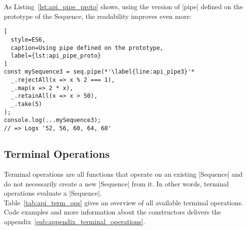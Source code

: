 As Listing~\ref{lst:api_pipe_proto} shows, using the version of |pipe| defined
on the prototype of the Sequence, the readability improves even more:
\begin{lstlisting}[
  style=ES6,
  caption=Using pipe defined on the prototype,
  label={lst:api_pipe_proto}
]
const mySequence3 = seq.pipe(*'\label{line:api_pipe3}'*
  _.rejectAll(x => x % 2 === 1),
  _.map(x => 2 * x),
  _.retainAll(x => x > 50),
  _.take(5)
);
console.log(...mySequence3);
// => Logs '52, 56, 60, 64, 68'
\end{lstlisting}


\subsection{Terminal Operations} %
\label{sub:api_Terminal Operations}
Terminal operations are all functions that operate on an existing |Sequence|
and do not necessarily create a new |Sequence| from it. In other words,
terminal operations evaluate a |Sequence|.\\ 
Table~\ref{tab:api_term_ops} gives an overview of all available terminal
operations.\\
Code examples and more information about the constructors delivers the
appendix~\ref{sub:appendix_terminal_operations}.

